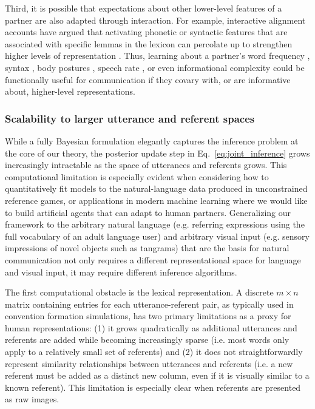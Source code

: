 Third, it is possible that expectations about other lower-level features of a partner are also adapted through interaction.
For example, interactive alignment accounts \cite{pickering2004toward} have argued that activating phonetic or syntactic features that are associated with specific lemmas in the lexicon can percolate up to strengthen higher levels of representation \cite{roelofs1992spreading,pickering1998representation}.
Thus, learning about a partner's word frequency \cite{louwerse2012behavior}, syntax \cite{gruberg2019syntactic,levelt1982surface}, body postures \cite{lakin2003using}, speech rate \cite{giles1991contexts}, or even informational complexity \cite{abney2014complexity} could be functionally useful for communication if they covary with, or are informative about, higher-level representations. 

\subsubsection{Scalability to larger utterance and referent spaces}
While a fully Bayesian formulation elegantly captures the inference problem at the core of our theory, the posterior update step in Eq.~\ref{eq:joint_inference} grows increasingly intractable as the space of utterances and referents grows. 
This computational limitation is especially evident when considering how to quantitatively fit models to the natural-language data produced in unconstrained reference games, or applications in modern machine learning where we would like to build artificial agents that can adapt to human partners.
Generalizing our framework to the arbitrary natural language (e.g. referring expressions using the full vocabulary of an adult language user) and arbitrary visual input (e.g. sensory impressions of novel objects such as tangrams) that are the basis for natural communication not only requires a different representational space for language and visual input, it may require different inference algorithms. 

The first computational obstacle is the lexical representation.
A discrete $m\times n$ matrix containing entries for each utterance-referent pair, as typically used in convention formation simulations, has two primary limitations as a proxy for human representations: (1) it  grows quadratically as additional utterances and referents are added while becoming increasingly sparse (i.e. most words only apply to a relatively small set of referents) and (2) it does not straightforwardly represent similarity relationships between utterances and referents (i.e. a new referent must be added as a distinct new column, even if it is visually similar to a known referent).
This limitation is especially clear when referents are presented as raw images. 

